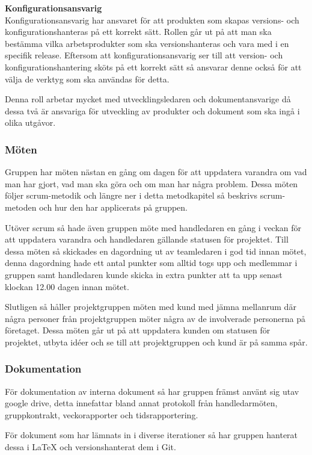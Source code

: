 \documentclass[a4paper,10pt]{article}
\begin{document}
\textbf{Konfigurationsansvarig}
\\Konfigurationsansvarig har ansvaret för att produkten som skapas versions- och konfigurationshanteras på ett korrekt sätt. Rollen går ut på att man ska bestämma vilka arbetsprodukter som ska versionshanteras och vara med i en specifik release. Eftersom att konfigurationsansvarig ser till att version- och konfigurationshantering sköts på ett korrekt sätt så ansvarar denne också för att välja de verktyg som ska användas för detta.

Denna roll arbetar mycket med utvecklingsledaren och dokumentansvarige då dessa två är ansvariga för utveckling av produkter och dokument som ska ingå i olika utgåvor.

\subsubsection{Möten}
Gruppen har möten nästan en gång om dagen för att uppdatera varandra om vad man har gjort, vad man ska göra och om man har några problem. Dessa möten följer scrum-metodik och längre ner i detta metodkapitel så beskrivs scrum-metoden och hur den har applicerats på gruppen.

Utöver scrum så hade även gruppen möte med handledaren en gång i veckan för att uppdatera varandra och handledaren gällande statusen för projektet. Till dessa möten så skickades en dagordning ut av teamledaren i god tid innan mötet, denna dagordning hade ett antal punkter som alltid togs upp och medlemmar i gruppen samt handledaren kunde skicka in extra punkter att ta upp senast klockan 12.00 dagen innan mötet.

Slutligen så håller projektgruppen möten med kund med jämna mellanrum där några personer från projektgruppen möter några av de involverade personerna på företaget. Dessa möten går ut på att uppdatera kunden om statusen för projektet, utbyta idéer och se till att projektgruppen och kund är på samma spår.

\subsubsection{Dokumentation}
För dokumentation av interna dokument så har gruppen främst använt sig utav google drive, detta innefattar bland annat protokoll från handledarmöten, gruppkontrakt, veckorapporter och tidsrapportering.

För dokument som har lämnats in i diverse iterationer så har gruppen hanterat dessa i LaTeX och versionshanterat dem i Git.
\end{document}
